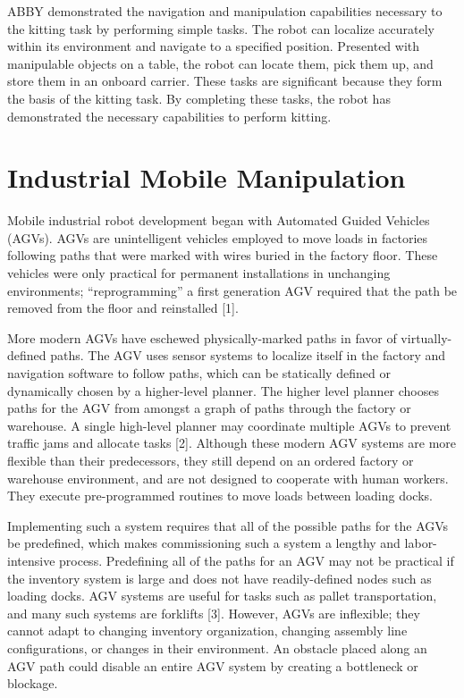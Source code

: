 \documentclass[]{cwru} %
\begin{document}
ABBY demonstrated the navigation and manipulation capabilities necessary
to the kitting task by performing simple tasks. The robot can localize
accurately within its environment and navigate to a specified position.
Presented with manipulable objects on a table, the robot can locate
them, pick them up, and store them in an onboard carrier. These tasks
are significant because they form the basis of the kitting task. By
completing these tasks, the robot has demonstrated the necessary
capabilities to perform kitting.

\chapter{Industrial Mobile Manipulation}

Mobile industrial robot development began with Automated Guided Vehicles
(AGVs). AGVs are unintelligent vehicles employed to move loads in
factories following paths that were marked with wires buried in the
factory floor. These vehicles were only practical for permanent
installations in unchanging environments; ``reprogramming'' a first
generation AGV required that the path be removed from the floor and
reinstalled {[}1{]}.

More modern AGVs have eschewed physically-marked paths in favor of
virtually-defined paths. The AGV uses sensor systems to localize itself
in the factory and navigation software to follow paths, which can be
statically defined or dynamically chosen by a higher-level planner. The
higher level planner chooses paths for the AGV from amongst a graph of
paths through the factory or warehouse. A single high-level planner may
coordinate multiple AGVs to prevent traffic jams and allocate tasks
{[}2{]}. Although these modern AGV systems are more flexible than their
predecessors, they still depend on an ordered factory or warehouse
environment, and are not designed to cooperate with human workers. They
execute pre-programmed routines to move loads between loading docks.

Implementing such a system requires that all of the possible paths for
the AGVs be predefined, which makes commissioning such a system a
lengthy and labor-intensive process. Predefining all of the paths for an
AGV may not be practical if the inventory system is large and does not
have readily-defined nodes such as loading docks. AGV systems are useful
for tasks such as pallet transportation, and many such systems are
forklifts {[}3{]}. However, AGVs are inflexible; they cannot adapt to
changing inventory organization, changing assembly line configurations,
or changes in their environment. An obstacle placed along an AGV path
could disable an entire AGV system by creating a bottleneck or blockage.
\end{document}
